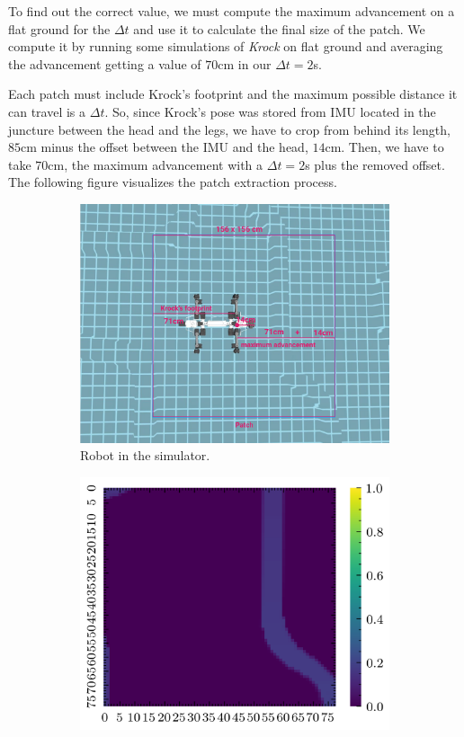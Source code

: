 \documentclass[../document.tex]{subfiles}
\begin{document}
To find out the correct value, we must compute the maximum advancement on a flat ground for the $\Delta t$ and use it to calculate the final size of the patch. We compute it by running some simulations of \emph{Krock} on flat ground and averaging the advancement getting a value of $70$cm in our $\Delta t = 2$s.

Each patch must include Krock's footprint and the maximum possible distance it can travel is a $\Delta t$. So, since Krock's pose was stored from IMU located in the juncture between the head and the legs, we have to crop from behind its length, $85$cm minus the offset between the IMU and the head, $14$cm. Then, we have to take $70$cm, the maximum advancement with a $\Delta t = 2$s plus the removed offset. The following figure visualizes the patch extraction process. 
\begin{figure}[htbp]
    \centering
    \begin{subfigure}[b]{0.66\textwidth}
        \includegraphics[width=\textwidth]{../img/3/crop/crop.png}
        \caption{Robot in the simulator.}
    \end{subfigure}
    \begin{subfigure}[b]{0.45\textwidth}
        \includegraphics[width=\textwidth]{../img/3/crop/test-1-2d.png}

\end{subfigure}
\end{figure}
\end{document}
